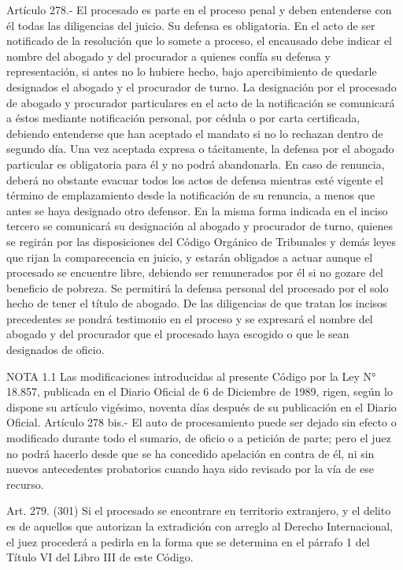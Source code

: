     Artículo 278.- El procesado es parte en el proceso penal y deben entenderse con él todas las diligencias del juicio. Su defensa es obligatoria.
    En el acto de ser notificado de la resolución que lo somete a proceso, el encausado debe indicar el nombre del abogado y del procurador a quienes confía su defensa y representación, si antes no lo hubiere hecho, bajo apercibimiento de quedarle designados el abogado y el procurador de turno.
    La designación por el procesado de abogado y procurador particulares en el acto de la notificación se comunicará a éstos mediante notificación personal, por cédula o por carta certificada, debiendo entenderse que han aceptado el mandato si no lo rechazan dentro de segundo día.
    Una vez aceptada expresa o tácitamente, la defensa por el abogado particular es obligatoria para él y no podrá abandonarla. En caso de renuncia, deberá no obstante evacuar todos los actos de defensa mientras esté vigente el término de emplazamiento desde la notificación de su renuncia, a menos que antes se haya designado otro defensor.
    En la misma forma indicada en el inciso tercero se comunicará su designación al abogado y procurador de turno, quienes se regirán por las disposiciones del Código Orgánico de Tribunales y demás leyes que rijan la comparecencia en juicio, y estarán obligados a actuar aunque el procesado se encuentre libre, debiendo ser remunerados por él si no gozare del beneficio de pobreza.
    Se permitirá la defensa personal del procesado por el solo hecho de tener el título de abogado.
    De las diligencias de que tratan los incisos precedentes se pondrá testimonio en el proceso y se expresará el nombre del abogado y del procurador que el procesado haya escogido o que le sean designados de oficio.



NOTA 1.1
      Las modificaciones introducidas al presente Código por la Ley N° 18.857, publicada en el Diario Oficial de 6 de Diciembre de 1989, rigen, según lo dispone su artículo vigésimo, noventa días después de su publicación en el Diario Oficial.
    Artículo 278 bis.- El auto de procesamiento puede ser dejado sin efecto o modificado durante todo el sumario, de oficio o a petición de parte; pero el juez no podrá hacerlo desde que se ha concedido apelación en contra de él, ni sin nuevos antecedentes probatorios cuando haya sido revisado por la vía de ese recurso.

    Art. 279. (301) Si el procesado se encontrare en territorio extranjero, y el delito es de aquellos que autorizan la extradición con arreglo al Derecho Internacional, el juez procederá a pedirla en la forma que se determina en el párrafo 1 del Título VI del Libro III de este Código.



